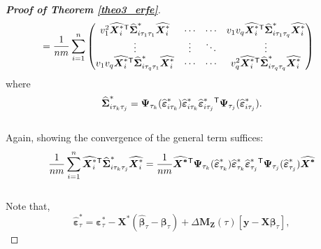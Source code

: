 \documentclass[15pt,a4paper]{article}
\newcommand{\transpose}{{}^{\text{\sffamily T}}}
\begin{document}
\begin{proof}[\textbf{Proof of Theorem \ref{theo3_erfe}}]
\begin{align*}
\begin{split}
        &=\frac{1}{nm}\sum_{i=1}^{n}
         \begin{pmatrix}
          v_1^2\widehat{\boldsymbol{X}^{*}_i}\transpose\widehat{\boldsymbol{\Sigma}}^{*}_{i\tau_{1}\tau_{1}} \widehat{\boldsymbol{X}^{*}_i}
          & \cdots
          & \cdots &   v_1v_q\widehat{\boldsymbol{X}^{*}_i}\transpose\widehat{\boldsymbol{\Sigma}}^{*}_{i\tau_{1}\tau_{q}} \widehat{\boldsymbol{X}^{*}_i}  \\
          \vdots  & \vdots  & \ddots & \vdots \\
            v_1v_q\widehat{\boldsymbol{X}^{*}_i}\transpose\widehat{\boldsymbol{\Sigma}}^{*}_{i\tau_{q}\tau_{1}} \widehat{\boldsymbol{X}^{*}_i}  
          & \cdots
          & \cdots
          &   v_q^2\widehat{\boldsymbol{X}^{*}_i}\transpose\widehat{\boldsymbol{\Sigma}}^{*}_{i\tau_{q}\tau_{q}}\widehat{\boldsymbol{X}^{*}_i} 
         \end{pmatrix}
    \end{split}
\end{align*}
where 
\begin{equation*}
\widehat{\boldsymbol{\Sigma}}^{*}_{i\tau_{k}\tau_{j}}=\boldsymbol{\Psi}_{\tau_k}(\widehat{\boldsymbol{\varepsilon}}^{*}_{i\tau_k})\widehat{\boldsymbol{\varepsilon}}^{*}_{i\tau_k}\widehat{\boldsymbol{\varepsilon}}^{*}_{i\tau_j}\transpose
\boldsymbol{\Psi}_{\tau_j}(\widehat{\boldsymbol{\varepsilon}}^{*}_{i\tau_j}).
\end{equation*}
~~\\
Again, showing the convergence of the general term suffices:
\begin{equation}\label{terme_general_d0_erfe}
    \frac{1}{nm}\sum_{i=1}^{n}\widehat{\boldsymbol{X}^{*}_i}\transpose\widehat{\boldsymbol{\Sigma}}^{*}_{i\tau_{k}\tau_{j}}\widehat{\boldsymbol{X}^{*}_i}=\frac{1}{nm}
    \boldsymbol{\widehat{\boldsymbol{X}^{*}}}\transpose\boldsymbol{\Psi}_{\tau_k}(\widehat{\boldsymbol{\varepsilon}}^{*}_{\tau_k})\widehat{\boldsymbol{\varepsilon}}^{*}_{\tau_k}\widehat{\boldsymbol{\varepsilon}}^{*}_{\tau_j}\transpose
        \boldsymbol{\Psi}_{\tau_j}(\widehat{\boldsymbol{\varepsilon}}^{*}_{\tau_j})\boldsymbol{\widehat{\boldsymbol{X}^{*}}}
\end{equation}
~~\\
Note that,
\begin{equation*}
\widehat{\boldsymbol{\varepsilon}}^{*}_{\tau}=\boldsymbol{\varepsilon}^{*}_{\tau}-\boldsymbol{X}^{*}(\widehat{\boldsymbol{\beta}}_{\tau}-\boldsymbol{\beta}_{\tau}) + \Delta\boldsymbol{M}_{\boldsymbol{Z}}(\tau)[\boldsymbol{y}-\boldsymbol{X}\boldsymbol{\beta}_{\tau}],

\end{equation*}
\end{proof}
\end{document}
